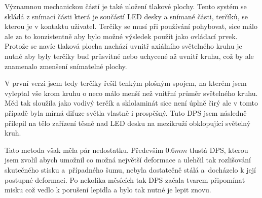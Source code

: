Významnou mechanickou částí je také uložení tlakové plochy.
Tento systém se skládá z snímací části která je součástí LED desky a snímané části, terčíků, se kterou je v kontaktu uživatel.
Terčíky se musí při používání pohybovat, sice málo ale za to konzistentně aby bylo možné výsledek použít jako ovládací prvek.
Protože se navíc tlaková plocha nachází uvnitř axiálního světelného kruhu je nutné aby byly terčíky buď průsvitné nebo uchycené až uvnitř kruhu, což by ale znamenalo zmenšení snímatelné plochy.

V první verzi jsem tedy terčíky řešil tenkým plošným spojem, na kterém jsem vyleptal vše krom kruhu o neco málo menší než vnitřní průměr světelného kruhu.
Měd tak sloužila jako vodivý terčík a sklolaminát sice není úplně čirý ale v tomto případě byla mírná difuze světla vlastně i prospěšný.
Tuto DPS jsem následně přilepil na tělo zařízení těsně nad LED desku na mezikruží obklopující světelný kruh.

Tato metoda však měla pár nedostatku.
Především \(0.6 mm\) tlustá DPS, kterou jsem zvolil abych umožnil co možná největší deformace a ulehčil tak rozlišování skutečného stisku a~případného šumu, nebyla dostatečně stálá a~docházelo k její postupné deformaci.
Po nekolika měsících tak DPS začala tvarem připomínat misku což vedlo k porušení lepidla a bylo tak nutné je lepit znovu.


